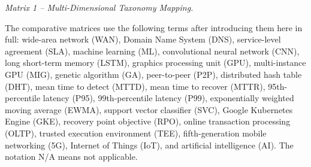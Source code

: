 \documentclass[10pt]{article}
\begin{document}
\medskip\noindent\textit{Matrix 1 -- Multi-Dimensional Taxonomy Mapping.}\par\smallskip

The comparative matrices use the following terms after introducing them here in full: wide-area network (WAN), Domain Name System (DNS), service-level agreement (SLA), machine learning (ML), convolutional neural network (CNN), long short-term memory (LSTM), graphics processing unit (GPU), multi-instance GPU (MIG), genetic algorithm (GA), peer-to-peer (P2P), distributed hash table (DHT), mean time to detect (MTTD), mean time to recover (MTTR), 95th-percentile latency (P95), 99th-percentile latency (P99), exponentially weighted moving average (EWMA), support vector classifier (SVC), Google Kubernetes Engine (GKE), recovery point objective (RPO), online transaction processing (OLTP), trusted execution environment (TEE), fifth-generation mobile networking (5G), Internet of Things (IoT), and artificial intelligence (AI). The notation N/A means not applicable.
\end{document}
